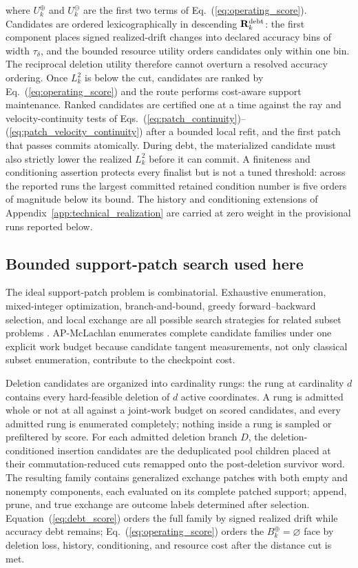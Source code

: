 \documentclass[
  reprint,
  amsmath,
  amssymb,
  aps,
  pra,
  nofootinbib,
  superscriptaddress,
  floatfix
]{revtex4-2}
\begin{document}
where $U_k^{\oplus}$ and $U_k^{\ominus}$ are the first two terms of Eq.~(\ref{eq:operating_score}).  Candidates are ordered lexicographically in descending $\mathbf R_k^{\rm debt}$: the first component places signed realized-drift changes into declared accuracy bins of width $\tau_\delta$, and the bounded resource utility orders candidates only within one bin.  The reciprocal deletion utility therefore cannot overturn a resolved accuracy ordering.  Once $L_k^2$ is below the cut, candidates are ranked by Eq.~(\ref{eq:operating_score}) and the route performs cost-aware support maintenance.  Ranked candidates are certified one at a time against the ray and velocity-continuity tests of Eqs.~(\ref{eq:patch_continuity})--(\ref{eq:patch_velocity_continuity}) after a bounded local refit, and the first patch that passes commits atomically.  During debt, the materialized candidate must also strictly lower the realized $L_k^2$ before it can commit.  A finiteness and conditioning assertion protects every finalist but is not a tuned threshold: across the reported runs the largest committed retained condition number is five orders of magnitude below its bound.  The history and conditioning extensions of Appendix~\ref{app:technical_realization} are carried at zero weight in the provisional runs reported below.

\subsection{Bounded support-patch search used here}

The ideal support-patch problem is combinatorial.  Exhaustive enumeration, mixed-integer optimization, branch-and-bound, greedy forward--backward selection, and local exchange are all possible search strategies for related subset problems \cite{Natarajan1995SparseApprox,BertsimasKingMazumder2016,DasKempe2011,Elenberg2018WeakSubmodularity}.  AP-McLachlan enumerates complete candidate families under one explicit work budget because candidate tangent measurements, not only classical subset enumeration, contribute to the checkpoint cost.

Deletion candidates are organized into cardinality rungs: the rung at cardinality $d$ contains every hard-feasible deletion of $d$ active coordinates.  A rung is admitted whole or not at all against a joint-work budget on scored candidates, and every admitted rung is enumerated completely; nothing inside a rung is sampled or prefiltered by score.  For each admitted deletion branch $D$, the deletion-conditioned insertion candidates are the deduplicated pool children placed at their commutation-reduced cuts remapped onto the post-deletion survivor word.  The resulting family contains generalized exchange patches with both empty and nonempty components, each evaluated on its complete patched support; append, prune, and true exchange are outcome labels determined after selection.  Equation~(\ref{eq:debt_score}) orders the full family by signed realized drift while accuracy debt remains; Eq.~(\ref{eq:operating_score}) orders the $B_k^{\oplus}=\varnothing$ face by deletion loss, history, conditioning, and resource cost after the distance cut is met.
\end{document}
